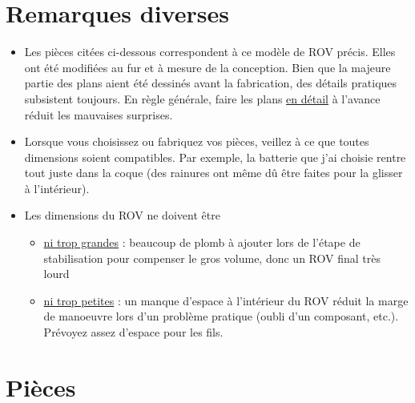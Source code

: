 \documentclass[11pt,a4paper]{article}
\begin{document}
  
  \section{Remarques diverses}
    \begin{itemize}
      \item Les pièces citées ci-dessous correspondent à ce modèle de ROV précis. Elles ont été modifiées au fur et à mesure de la conception. Bien que la majeure partie des plans aient été dessinés avant la fabrication, des détails pratiques subsistent toujours. En règle générale, faire les plans \underline{en détail} à l'avance réduit les mauvaises surprises.
    
      \item Lorsque vous choisissez ou fabriquez vos pièces, veillez à ce que toutes dimensions soient compatibles. Par exemple, la batterie que j'ai choisie rentre tout juste dans la coque (des rainures ont même dû être faites pour la glisser à l'intérieur).
      
      \item Les dimensions du ROV ne doivent être 
      \begin{itemize}
        \item \underline{ni trop grandes} : beaucoup de plomb à ajouter lors de l'étape de stabilisation pour compenser le gros volume, donc un ROV final très lourd
        \item \underline{ni trop petites} : un manque d'espace à l'intérieur du ROV réduit la marge de manoeuvre lors d'un problème pratique (oubli d'un composant, etc.). Prévoyez assez d'espace pour les fils.
      \end{itemize}
      
    
    \end{itemize}

  \section{Pièces}

  
\end{document}
